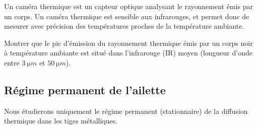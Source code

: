 
Un caméra thermique est un capteur optique analysant le rayonnement émis par un corps. Un caméra thermique est sensible aux infrarouges, et permet donc de mesurer avec précision des températures proches de la température ambiante.
\begin{protocole}
\todo Montrer que le pic d’émission du rayonnement thermique émis par un corps noir à température ambiante est situé dans l’infrarouge (IR) moyen (longueur d’onde entre $\SI{3}{\micro m}$ et $\SI{50}{\micro m}$).
\end{protocole}
%
%
%
%

\subsection{Régime permanent de l’ailette}

Nous étudierons uniquement le régime permanent (stationnaire) de la diffusion thermique dans les tiges métalliques.


